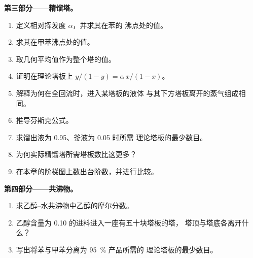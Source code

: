 \begin{problem}
\medskip
\noindent\textbf{第三部分——精馏塔。}
\begin{enumerate}[resume]
  \item 定义相对挥发度 $\alpha$，并求其在苯的
        沸点处的值。
  \item 求其在甲苯沸点处的值。
  \item 取几何平均值作为整个塔的值。
  \item 证明在理论塔板上 $y/(1 - y) = \alpha\,x/(1 - x)$。
  \item 解释为何在全回流时，进入某塔板的液体
        与其下方塔板离开的蒸气组成相同。
  \item 推导芬斯克公式。
  \item 求馏出液为 0.95、釜液为 0.05 时所需
        理论塔板的最少数目。
  \item 为何实际精馏塔所需塔板数比这更多？
  \item 在本章的阶梯图上数出台阶数，并进行比较。
\end{enumerate}

\medskip
\noindent\textbf{第四部分——共沸物。}
\begin{enumerate}[resume]
  \item 求乙醇–水共沸物中乙醇的摩尔分数。
  \item 乙醇含量为 0.10 的进料进入一座有五十块塔板的塔，
        塔顶与塔底各离开什么？
  \item 写出将苯与甲苯分离为 95~\% 产品所需的
        理论塔板的最少数目。
\end{enumerate}
\end{problem}
